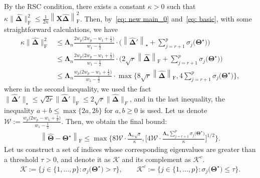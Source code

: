 \documentclass[12pt]{article}
\begin{document}
By the RSC condition, there exists a constant $\kappa>0$ such that $\kappa \|\boldsymbol{\widehat{\Delta}}\|_{\text{F}}^{2}\leq \frac{1}{2n} \left\| \boldsymbol{X} \boldsymbol{\widehat{\Delta}} \right\|_{\text{F}}^{2}$.
Then, by~\eqref{eq: new main_0} and~\eqref{eq: basic}, with some straightforward calculations, we have
\begin{align} 
    \kappa \|\boldsymbol{\widehat{\Delta}}\|_{\text{F}}^{2}
    &\leq  
    \boldsymbol{\Lambda}_{n}\frac{2w_{p}\big(2w_{p}-w_{1}+\frac{1}{2}\big)}{w_{1}-\frac{1}{2}}
    \cdot \bigg( \left\| \boldsymbol{\widehat{\Delta}}' \right\|_{\star} + \sum_{j=r+1}^{p}\sigma_{j}\big(\boldsymbol{\Theta^{\star}}\big) \bigg) \nonumber \\
    &\leq 
    \boldsymbol{\Lambda}_{n}\frac{2w_{p}\big(2w_{p}-w_{1}+\frac{1}{2}\big)}{w_{1}-\frac{1}{2}}
    \cdot \bigg( 2\sqrt{r} \left\| \boldsymbol{\widehat{\Delta}} \right\|_{\text{F}} + \sum_{j=r+1}^{p}\sigma_{j}\big(\boldsymbol{\Theta^{\star}}\big) \bigg) \nonumber \\
    &\leq 
    \boldsymbol{\Lambda}_{n} \frac{w_{p}\big(2w_{p}-w_{1}+\frac{1}{2}\big)}{w_{1}-\frac{1}{2}}
    \cdot \max \bigg\{ 8 \sqrt{r} \left\| \boldsymbol{\widehat{\Delta}} \right\|_{\text{F}}, 4\sum_{j=r+1}^{p}\sigma_{j}\big(\boldsymbol{\Theta^{\star}}\big) 
    \bigg\} \nonumber,
\end{align}
where in the second inequality, we used the fact 
$\|\boldsymbol{\widehat{\Delta}}'\|_{\star}\leq\sqrt{2r}\|\boldsymbol{\widehat{\Delta}}'\|_{\text{F}} \leq 2\sqrt{r}\|\boldsymbol{\widehat{\Delta}}\|_{F}$, and in the last inequality, 
the inequality $a+b\leq \max\{2a, 2b\}$ for $a,b\geq 0$ is used.
Let us denote $\mathcal{W}:=\frac{w_{p}\big(2w_{p}-w_{1}+\frac{1}{2}\big)}{w_{1}-\frac{1}{2}}$.
Then, we obtain the final bound:
\begin{align} \label{Est_bound}
    \left\| \widehat{\boldsymbol{\Theta}} - \boldsymbol{\Theta^{\star}} \right\|_{\text{F}}
    \leq \max\bigg\{ 8\mathcal{W} \cdot \frac{\boldsymbol{\Lambda}_{n}\sqrt{r}}{\kappa}, 
    \bigg[  4 \mathcal{W} \cdot \frac{\boldsymbol{\Lambda}_{n}\sum_{j=r+1}^{p}\sigma_{j}\big(\boldsymbol{\Theta^{\star}}\big)}{\kappa}  \bigg]^{1/2}
    \bigg\}.
\end{align}
Let us construct a set of indices whose corresponding eigenvalues are greater than a threshold $\tau>0$, and denote it as $\mathcal{K}$ and its complement as $\mathcal{K}^{c}$.
\begin{align*}
    \mathcal{K}:=\bigg\{ j \in \{1,\dots,p\} : \sigma_{j}\big(\boldsymbol{\Theta}^{\star} \big) > \tau \bigg\}, \qquad 
    \mathcal{K}^{c}:=\bigg\{ j \in \{1,\dots,p\} : \sigma_{j}\big(\boldsymbol{\Theta}^{\star} \big) \leq \tau \bigg\}.
\end{align*}
\end{document}
